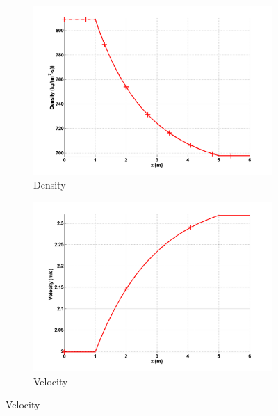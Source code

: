 %
%
\begin{figure}[H]
        \centering
        \begin{subfigure}[b]{0.495\textwidth}
                \centering
                \includegraphics[width=\textwidth]{figures/liquid_friction_heat_density_source_terms.png}
                \caption{Density}
                \label{fig:1d-liquid-friction-heat-density-sct3}
        \end{subfigure}%
        \begin{subfigure}[b]{0.495\textwidth}
                \centering
                \includegraphics[width=\textwidth]{figures/liquid_friction_heat_velocity_source_terms.png}
                \caption{Velocity}
                \label{fig:1d-liquid-friction-heat-velocity-sct3}
        \end{subfigure}


\end{figure}
